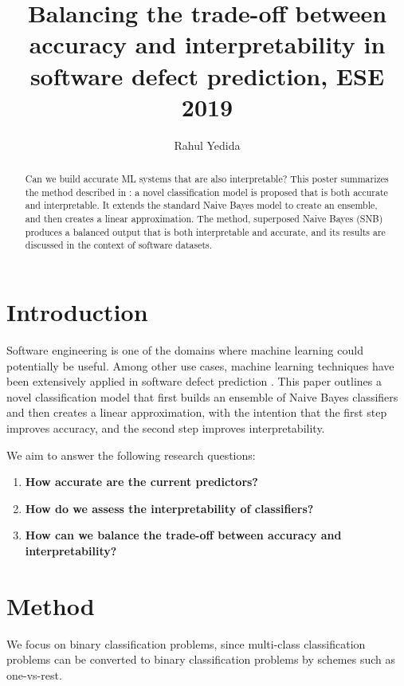 \documentclass[sigconf]{acmart}
\begin{document}
\title{Balancing the trade-off between accuracy and interpretability in software defect prediction, ESE 2019}
\author{Rahul Yedida}

\begin{abstract}
Can we build accurate ML systems that are also interpretable? This poster summarizes the method described in \cite{mori2019balancing}: a novel classification model is proposed that is both accurate and interpretable. It extends the standard Naive Bayes model to create an ensemble, and then creates a linear approximation. The method, superposed Naive Bayes (SNB) produces a balanced output that is both interpretable and accurate, and its results are discussed in the context of software datasets.
\end{abstract}

\maketitle
{}
\section{Introduction}

Software engineering is one of the domains where machine learning could potentially be useful. Among other use cases, machine learning techniques have been extensively applied in software defect prediction \cite{malhotra2015systematic}. This paper outlines a novel classification model that first builds an ensemble of Naive Bayes classifiers and then creates a linear approximation, with the intention that the first step improves accuracy, and the second step improves interpretability.

We aim to answer the following research questions:
\begin{enumerate}
	\item \textbf{How accurate are the current predictors?}
	\item \textbf{How do we assess the interpretability of classifiers?}
	\item \textbf{How can we balance the trade-off between accuracy and interpretability?}
\end{enumerate}

\section{Method}
We focus on binary classification problems, since multi-class classification problems can be converted to binary classification problems by schemes such as one-vs-rest.
\end{document}
